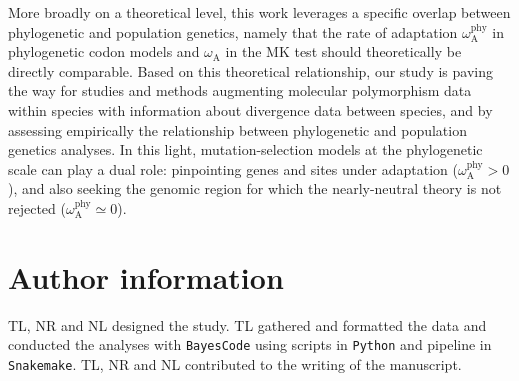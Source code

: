 \documentclass[9pt,twocolumn,twoside,lineno]{pnas-new}
\newcommand{\rateApop}{\omega_{\mathrm{A}}}
\newcommand{\rateAphy}{\rateApop^{\mathrm{phy}}}
\begin{document}
More broadly on a theoretical level, this work leverages a specific overlap between phylogenetic and population genetics, namely that the rate of adaptation $\rateAphy$ in phylogenetic codon models and $\rateApop$ in the MK test should theoretically be directly comparable.
Based on this theoretical relationship, our study is paving the way for studies and methods augmenting molecular polymorphism data within species with information about divergence data between species\cite{chen_hunting_2021}, and by assessing empirically the relationship between phylogenetic and population genetics analyses\cite{thorne_codon_2012}.
In this light, mutation-selection models at the phylogenetic scale can play a dual role: pinpointing genes and sites under adaptation ($\rateAphy > 0$), and also seeking the genomic region for which the nearly-neutral theory is not rejected ($\rateAphy \simeq 0$).


\section{Author information}\label{sec:author-information}
TL, NR and NL designed the study.
TL gathered and formatted the data and conducted the analyses with \texttt{BayesCode} using scripts in \texttt{Python} and pipeline in \texttt{Snakemake}.
TL, NR and NL contributed to the writing of the manuscript.
\end{document}
